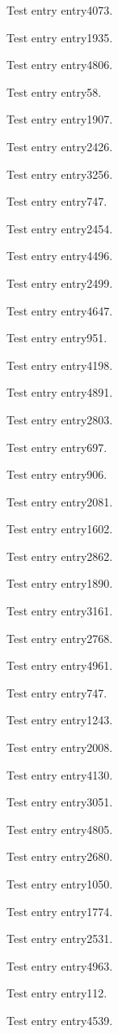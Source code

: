 Test entry \gls{entry4073}.

Test entry \gls{entry1935}.

Test entry \gls{entry4806}.

Test entry \gls{entry58}.

Test entry \gls{entry1907}.

Test entry \gls{entry2426}.

Test entry \gls{entry3256}.

Test entry \gls{entry747}.

Test entry \gls{entry2454}.

Test entry \gls{entry4496}.

Test entry \gls{entry2499}.

Test entry \gls{entry4647}.

Test entry \gls{entry951}.

Test entry \gls{entry4198}.

Test entry \gls{entry4891}.

Test entry \gls{entry2803}.

Test entry \gls{entry697}.

Test entry \gls{entry906}.

Test entry \gls{entry2081}.

Test entry \gls{entry1602}.

Test entry \gls{entry2862}.

Test entry \gls{entry1890}.

Test entry \gls{entry3161}.

Test entry \gls{entry2768}.

Test entry \gls{entry4961}.

Test entry \gls{entry747}.

Test entry \gls{entry1243}.

Test entry \gls{entry2008}.

Test entry \gls{entry4130}.

Test entry \gls{entry3051}.

Test entry \gls{entry4805}.

Test entry \gls{entry2680}.

Test entry \gls{entry1050}.

Test entry \gls{entry1774}.

Test entry \gls{entry2531}.

Test entry \gls{entry4963}.

Test entry \gls{entry112}.

Test entry \gls{entry4539}.

